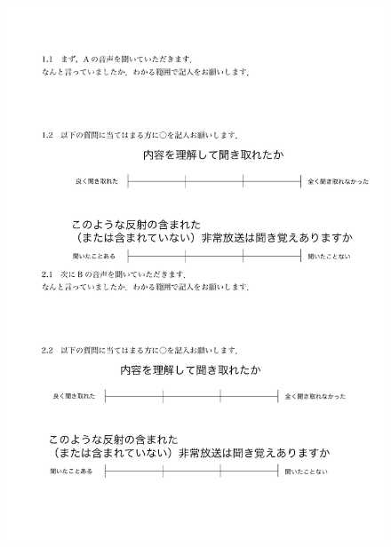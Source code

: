 \documentclass[a4j,11pt]{jsarticle}
\begin{document}
\begin{figure}[h]
\begin{center}
 \includegraphics[clip,width=180mm,height=240mm]{shitsumonshi2.pdf}
\end{center}
 \label{fig:kaitourei2}
\end{figure}
\end{document}
